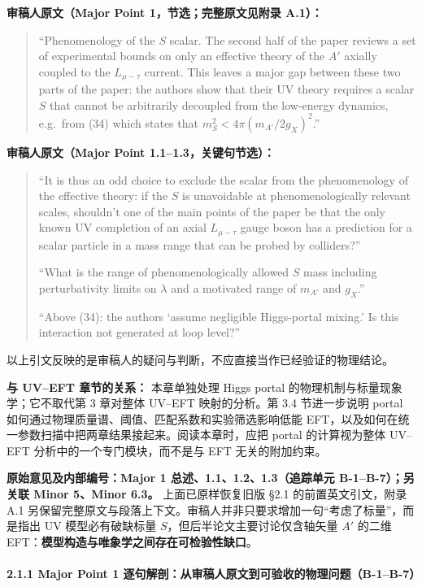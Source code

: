 \documentclass[
  chinese,
  UTF8]{ctexart}
\begin{document}
\textbf{审稿人原文（Major Point 1，节选；完整原文见附录 A.1）：}

\begin{quote}
``Phenomenology of the \(S\) scalar. The second half of the paper
reviews a set of experimental bounds on only an effective theory of the
\(A'\) axially coupled to the \(L_{\mu-\tau}\) current. This leaves a
major gap between these two parts of the paper: the authors show that
their UV theory requires a scalar \(S\) that cannot be arbitrarily
decoupled from the low-energy dynamics, e.g.~from (34) which states that
\(m_S^2 < 4\pi(m_{A'}/2g_X)^2\).''
\end{quote}

\textbf{审稿人原文（Major Point 1.1--1.3，关键句节选）：}

\begin{quote}
``It is thus an odd choice to exclude the scalar from the phenomenology
of the effective theory: if the \(S\) is unavoidable at
phenomenologically relevant scales, shouldn't one of the main points of
the paper be that the only known UV completion of an axial
\(L_{\mu-\tau}\) gauge boson has a prediction for a scalar particle in a
mass range that can be probed by colliders?''

``What is the range of phenomenologically allowed \(S\) mass including
perturbativity limits on \(\lambda\) and a motivated range of \(m_{A'}\)
and \(g_X\).''

``Above (34): the authors `assume negligible Higgs-portal mixing.' Is
this interaction not generated at loop level?''
\end{quote}

以上引文反映的是审稿人的疑问与判断，不应直接当作已经验证的物理结论。

\textbf{与 UV--EFT 章节的关系：} 本章单独处理 Higgs portal
的物理机制与标量现象学；它不取代第 3 章对整体 UV--EFT 映射的分析。第 3.4
节进一步说明 portal 如何通过物理质量谱、阈值、匹配系数和实验筛选影响低能
EFT，以及如何在统一参数扫描中把两章结果接起来。阅读本章时，应把 portal
的计算视为整体 UV--EFT 分析中的一个专门模块，而不是与 EFT
无关的附加约束。

\textbf{原始意见及内部编号：Major 1 总述、1.1、1.2、1.3（追踪单元
B-1--B-7）；另关联 Minor 5、Minor 6.3。} 上面已原样恢复旧版 §2.1
的前置英文引文，附录 A.1
另保留完整原文与段落上下文。审稿人并非只要求增加一句``考虑了标量''，而是指出
UV 模型必有破缺标量 \(S\)，但后半论文主要讨论仅含轴矢量 \(A'\) 的二维
EFT：\textbf{模型构造与唯象学之间存在可检验性缺口}。

\paragraph{2.1.1 Major Point 1
逐句解剖：从审稿人原文到可验收的物理问题（B-1--B-7）}\label{major-point-1-ux9010ux53e5ux89e3ux5256ux4eceux5ba1ux7a3fux4ebaux539fux6587ux5230ux53efux9a8cux6536ux7684ux7269ux7406ux95eeux9898b-1b-7}
\end{document}
